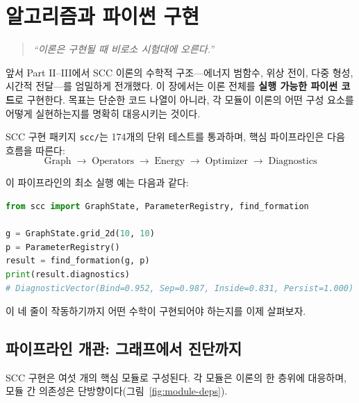 
\chapter{알고리즘과 파이썬 구현}
\label{ch:algorithms}

\begin{quote}
\textit{``이론은 구현될 때 비로소 시험대에 오른다.''}
\end{quote}

\noindent
앞서 Part II--III에서 SCC 이론의 수학적 구조---에너지 범함수, 위상 전이, 다중 형성, 시간적 전달---를 엄밀하게 전개했다. 이 장에서는 이론 전체를 \textbf{실행 가능한 파이썬 코드}로 구현한다. 목표는 단순한 코드 나열이 아니라, 각 모듈이 이론의 어떤 구성 요소를 어떻게 실현하는지를 명확히 대응시키는 것이다.

SCC 구현 패키지 \texttt{scc/}는 174개의 단위 테스트를 통과하며, 핵심 파이프라인은 다음 흐름을 따른다:
\[
\text{Graph} \;\longrightarrow\; \text{Operators} \;\longrightarrow\; \text{Energy} \;\longrightarrow\; \text{Optimizer} \;\longrightarrow\; \text{Diagnostics}
\]

이 파이프라인의 최소 실행 예는 다음과 같다:
\begin{lstlisting}[language=Python, caption={SCC 형성 발견의 최소 예제}]
from scc import GraphState, ParameterRegistry, find_formation

g = GraphState.grid_2d(10, 10)
p = ParameterRegistry()
result = find_formation(g, p)
print(result.diagnostics)
# DiagnosticVector(Bind=0.952, Sep=0.987, Inside=0.831, Persist=1.000)
\end{lstlisting}

이 네 줄이 작동하기까지 어떤 수학이 구현되어야 하는지를 이제 살펴보자.


\section{파이프라인 개관: 그래프에서 진단까지}
\label{sec:pipeline-overview}

SCC 구현은 여섯 개의 핵심 모듈로 구성된다. 각 모듈은 이론의 한 층위에 대응하며, 모듈 간 의존성은 단방향이다(그림~\ref{fig:module-deps}).


